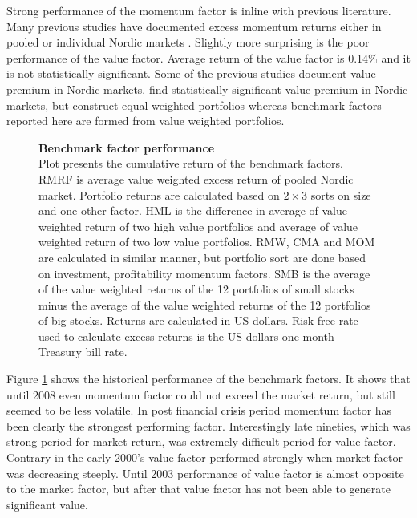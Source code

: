 \documentclass[12pt]{article}
\begin{document}
Strong performance of the momentum factor is inline with previous literature. Many previous studies have documented excess momentum returns either in pooled or individual Nordic markets \citep{grobys, leivo2011}. Slightly more surprising is the poor performance of the value factor. Average return of the value factor is 0.14\% and it is not statistically significant. Some of the previous studies document value premium in Nordic markets. \citet{grobys} find statistically significant value premium in Nordic markets, but \citeauthor{grobys} construct equal weighted portfolios whereas benchmark factors reported here are formed from value weighted portfolios. \par

\begin{figure}[ht]
\centering
\caption[Benchmark factor performance]{\textbf{Benchmark factor performance}\\ Plot presents the cumulative return of the benchmark factors. RMRF is average value weighted excess return of pooled Nordic market. Portfolio returns are calculated based on $2 \times 3$ sorts on size and one other factor. HML is the difference in average of value weighted return of two high value portfolios and average of value weighted return of two low value portfolios. RMW, CMA and MOM are calculated in similar manner, but portfolio sort are done based on investment, profitability momentum factors. SMB is the average of the value weighted returns of the 12 portfolios of small stocks minus the average of the value weighted returns of the 12 portfolios of big stocks. Returns are calculated in US dollars. Risk free rate used to calculate excess returns is the US dollars one-month Treasury bill rate.}

\label{plot:factor_performance}
\end{figure}

Figure \ref{plot:factor_performance} shows the historical performance of the benchmark factors. It shows that until 2008 even momentum factor could not exceed the market return, but still seemed to be less volatile. In post financial crisis period momentum factor has been clearly the strongest performing factor. Interestingly late nineties, which was strong period for market return, was extremely difficult period for value factor. Contrary in the early 2000's value factor performed strongly when market factor was decreasing steeply. Until 2003 performance of value factor is almost opposite to the market factor, but after that value factor has not been able to generate significant value. \par
\end{document}
